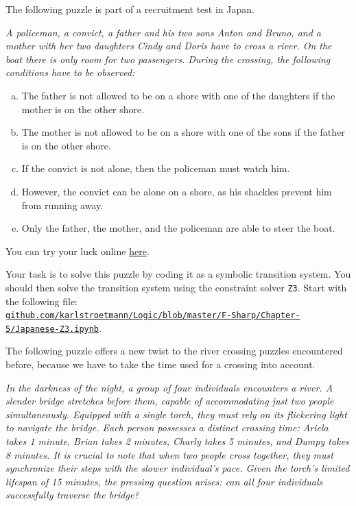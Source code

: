 \pagebreak

\exerciseEng
The following puzzle is part of a recruitment test in Japan.

\begin{minipage}{0.95\linewidth}
{\sl
  A policeman, a convict, a father and his two sons Anton and Bruno, and a mother with her two daughters Cindy and Doris have to cross a river. On the boat there is only room for two passengers.
During the crossing, the following conditions have to be observed:
\begin{enumerate}[(a)]
\item The father is not allowed to be on a shore with one of the daughters if the mother is on the other shore.
\item The mother is not allowed to be on a shore with one of the sons if the father is on the other shore.
\item If the convict is not alone, then the policeman must watch him.
\item However, the convict can be alone on a shore, as his shackles prevent him from running away.
\item Only the father, the mother, and the policeman are able to steer the boat.
\end{enumerate}}
\end{minipage}
\vspace*{0.2cm}

\noindent
You can try your luck online \href{https://flashmuseum.org/iq-%E9%81%8E%E6%B2%B3%E9%81%8A%E6%88%B2/}{here}.

\noindent
Your task is to solve this puzzle by coding it as a symbolic transition system.  You should then solve the
transition system using the constraint solver \texttt{Z3}.
Start with the following file:
\\[0.2cm]
\href{https://github.com/karlstroetmann/Logic/blob/master/F-Sharp/Chapter-5/Japanese-Z3.ipynb}{\small\texttt{github.com/karlstroetmann/Logic/blob/master/F-Sharp/Chapter-5/Japanese-Z3.ipynb}}.
\eox

\exerciseEng
The following puzzle offers a new twist to the river crossing puzzles encountered before, because we have to
take the time used for a crossing into account.

\begin{minipage}{0.95\linewidth}
  {\sl
    In the darkness of the night, a group of four individuals encounters a river. A slender bridge stretches
    before them, capable of accommodating just two people simultaneously. Equipped with a single torch, they
    must rely on its flickering light to navigate the bridge. Each person possesses a distinct crossing time:
    Ariela takes 1 minute, Brian takes 2 minutes, Charly takes 5 minutes, and Dumpy takes 8 minutes. It is
    crucial to note that when two people cross together, they must synchronize their steps with the slower
    individual's pace. Given the torch's limited lifespan of 15 minutes, the pressing question arises: can all
    four individuals successfully traverse the bridge? 
  }
\end{minipage}

